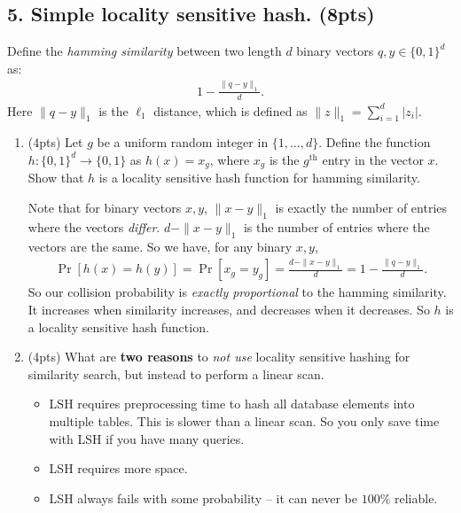 \documentclass[10pt]{article}
\begin{document}
\subsection{5. Simple locality sensitive hash. (\textbf{\small 8pts})}
Define the \emph{hamming similarity} between two length $d$ binary vectors $q,y \in \{0,1\}^d$ as:
\begin{align*}
1 - \frac{\|q - y\|_1}{d}.
\end{align*}
Here $\|q - y\|_1$ is the $\ell_1$ distance, which is defined as $\|z\|_1 = \sum_{i=1}^d |z_i|$.


\begin{enumerate}[label=(\alph*)]
	\item (4pts) 
	Let $g$ be a uniform random integer in $\{1, \ldots, d\}$. Define the function $h: \{0,1\}^d \rightarrow \{0,1\}$ as $h(x) = x_g$, where $x_g$ is the $g^\text{th}$ entry in the vector $x$. Show that $h$ is a locality sensitive hash function for {hamming similarity}.
	\vspace{1em}
	
	Note that for binary vectors $x,y$, $\|x - y\|_1$ is exactly the number of entries where the vectors \emph{differ}. $d - \|x - y\|_1$ is the number of entries where the vectors are the same. So we have, for any binary $x,y$,
	\begin{align*}
	\Pr[h(x) = h(y)] = \Pr[x_g = y_g] =  \frac{d - \|x - y\|_1}{d} = 1 - \frac{\|q - y\|_1}{d}.
	\end{align*}
	So our collision probability is \emph{exactly proportional} to the hamming similarity. It increases when similarity increases, and decreases when it decreases. So $h$ is a locality sensitive hash function.
	
	\item (4pts) What are \textbf{two reasons} to \emph{not use} locality sensitive hashing for similarity search, but instead to perform a linear scan. 
	\begin{itemize}
		\item LSH requires preprocessing time to hash all database elements into multiple tables. This is slower than a linear scan. So you only save time with LSH if you have many queries. 
		\item LSH requires more space. 
		\item LSH always fails with some probability -- it can never be $100 \% $ reliable. 
	\end{itemize}
\end{enumerate}
\end{document}

